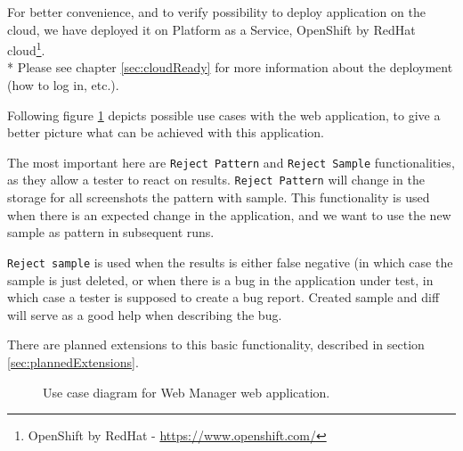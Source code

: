 \documentclass[11pt,oneside,final]{fithesis2}
\begin{document}
    For better convenience, and to verify possibility to deploy application on the cloud, we have
    deployed it on Platform as a Service, OpenShift by RedHat cloud\footnote{OpenShift by RedHat - \url{https://www.openshift.com/}}.
    \\* Please see chapter \ref{sec:cloudReady} for more information about the deployment (how to log in, etc.).
    
    Following figure \ref{fig:useCaseDiagramWebManApp} depicts possible use cases with the web application, to give a better picture what can be achieved
    with this application.
    
    The most important here are \texttt{Reject Pattern} and \texttt{Reject Sample} functionalities, as they allow a tester to react
    on results. \texttt{Reject Pattern} will change in the storage for all screenshots the pattern with sample. This functionality is
    used when there is an expected change in the application, and we want to use the new sample as pattern in subsequent runs.
    
    \texttt{Reject sample} is used when the results is either false negative (in which case the sample is just deleted, or when
    there is a bug in the application under test, in which case a tester is supposed to create a bug report. Created sample and diff
    will serve as a good help when describing the bug. 
    
    There are planned extensions to this basic functionality, described in section \ref{sec:plannedExtensions}.
    
    \begin{figure}[!htb]
      \begin{center}
      \leavevmode
      \centerline{}
      \end{center}
      \caption{Use case diagram for Web Manager web application.}
      \label{fig:useCaseDiagramWebManApp}
    \end{figure}
        
\end{document}
